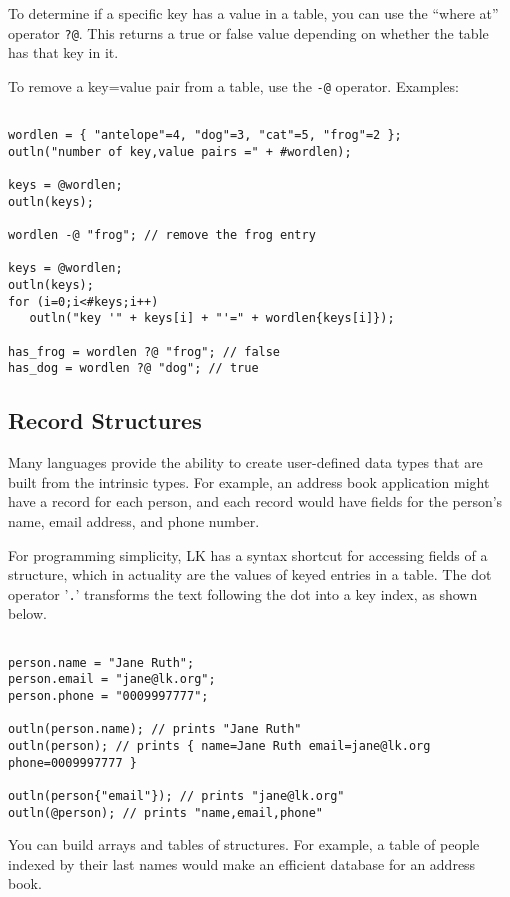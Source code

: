 \documentclass{article}
\begin{document}
To determine if a specific key has a value in a table, you can use the ``where at'' operator \texttt{?@}.  This returns a true or false value depending on whether the table has that key in it.

To remove a key=value pair from a table, use the \texttt{-@} operator.  Examples:

\begin{verbatim}

wordlen = { "antelope"=4, "dog"=3, "cat"=5, "frog"=2 };
outln("number of key,value pairs =" + #wordlen);

keys = @wordlen;
outln(keys);

wordlen -@ "frog"; // remove the frog entry

keys = @wordlen;
outln(keys);
for (i=0;i<#keys;i++)
   outln("key '" + keys[i] + "'=" + wordlen{keys[i]});
   
has_frog = wordlen ?@ "frog"; // false
has_dog = wordlen ?@ "dog"; // true

\end{verbatim}

\subsection{Record Structures}

Many languages provide the ability to create user-defined data types that are built from the intrinsic types.  For example, an address book application might have a record for each person, and each record would have fields for the person's name, email address, and phone number.  

For programming simplicity, LK has a syntax shortcut for accessing fields of a structure, which in actuality are the values of keyed entries in a table.  The dot operator '\texttt{.}' transforms the text following the dot into a key index, as shown below.

\begin{verbatim}

person.name = "Jane Ruth";
person.email = "jane@lk.org";
person.phone = "0009997777";

outln(person.name); // prints "Jane Ruth"
outln(person); // prints { name=Jane Ruth email=jane@lk.org phone=0009997777 }

outln(person{"email"}); // prints "jane@lk.org"
outln(@person); // prints "name,email,phone"

\end{verbatim}

You can build arrays and tables of structures.  For example, a table of people indexed by their last names would make an efficient database for an address book.
\end{document}
